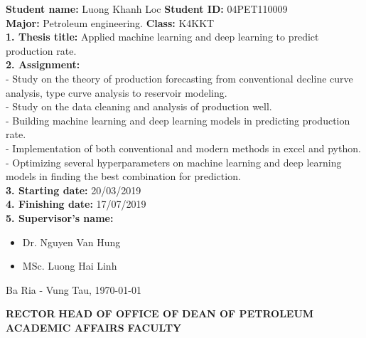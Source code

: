 \documentclass[12pt,a4paper]{report}
\begin{document}
\textbf{Student name:} Luong Khanh Loc \hspace*{2.4cm}\textbf{Student ID:} 04PET110009\\
\textbf{Major:} Petroleum engineering. \hspace*{3cm}\textbf{Class:} K4KKT\\
\textbf{1. Thesis title:}  Applied machine learning and deep learning to predict production rate.\\
\textbf{2. Assignment:} \\
\hspace*{1cm}- Study on the theory of production forecasting from conventional decline curve analysis, type curve analysis to reservoir modeling. \\
\hspace*{1cm}- Study on the data cleaning and analysis of production well.\\
\hspace*{1cm}- Building machine learning and deep learning models in predicting production rate.\\
\hspace*{1cm}- Implementation of both conventional and modern methods in excel and python.\\
\hspace*{1cm}- Optimizing several hyperparameters on machine learning and deep learning models in finding the best combination for prediction.\\
\textbf{3. Starting date: }20/03/2019\\
\textbf{4. Finishing date: }17/07/2019\\
\textbf{5. Supervisor’s name: }
	\begin{itemize}
		\item Dr. Nguyen Van Hung
		\item MSc. Luong Hai Linh
	\end{itemize}
\begin{flushright}
Ba Ria - Vung Tau, \today
\end{flushright}
\begingroup
\fontsize{12pt}{12pt}\selectfont
\textbf{RECTOR} \hspace*{70pt} \textbf{HEAD OF OFFICE OF} \hspace*{70pt} \textbf{DEAN OF PETROLEUM }\\
\hspace*{128pt} \textbf{ACADEMIC AFFAIRS} \hspace*{100pt} \textbf{FACULTY}
\endgroup
\end{document}
